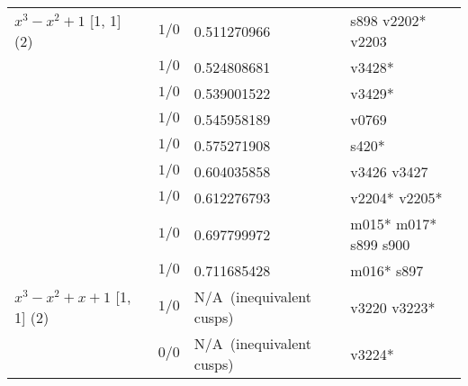 \documentclass[a4paper]{amsart}
\newcommand{\PreserveBackslash}[1]{\let\temp =\\#1\let\\=\temp}
\theoremstyle{definition}
\begin{document}
\begin{table}[p]
\begin{tabular}{|>{\PreserveBackslash\raggedright}p{3.5cm} |l %
	|l %
	|>{\PreserveBackslash\raggedright}p{5cm}|}
\hline



\hbox{$x^3 - x^2 + 1$} [1, 1] (2) &
$1/0$ &
0.511270966&
{s898 v2202* v2203} \\ %

\cline{2-4}

& %
$1/0$ &
0.524808681&
{v3428*} \\

\cline{2-4}

& %
$1/0$ &
0.539001522 &  %
{ v3429*} \\

\cline{2-4}


& %
$1/0$ &
0.545958189&
{v0769} \\

\cline{2-4}

& %
$1/0$ &
0.575271908&
{s420*} \\

\cline{2-4}

& %
$1/0$ &
0.604035858&
{v3426 v3427} \\ %

\cline{2-4}

& %
$1/0$ &
0.612276793&
{v2204* v2205*} \\

\cline{2-4}

& %
$1/0$ &
0.697799972&
{m015* m017* s899 s900} \\

\cline{2-4}

& %
$1/0$ &
0.711685428&
{m016* s897} \\

\hline



\hbox{$x^3 - x^2 + x + 1$} [1, 1] (2) &
$1/0$ &
N/A~(inequivalent cusps)&
{v3220 v3223* } \\

\cline{2-4}
& %
$0/0$ &
N/A~(inequivalent cusps)&
{v3224*} \\

\cline{2-4}


\end{tabular}
\end{table}
\end{document}
